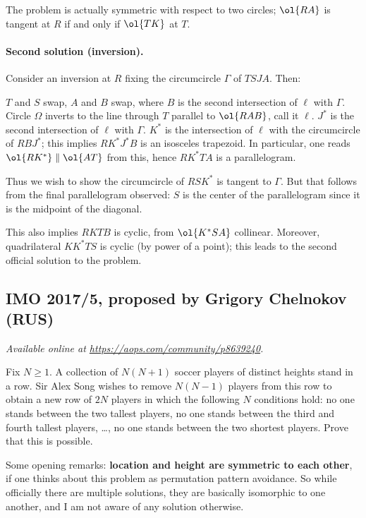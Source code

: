 \documentclass[11pt]{scrartcl}
\begin{document}
\begin{remark*}
  The problem is actually symmetric with respect to two circles;
  $\ol{RA}$ is tangent at $R$ if and only if $\ol{TK}$ at $T$.
\end{remark*}

\paragraph{Second solution (inversion).}
Consider an inversion at $R$ fixing the circumcircle $\Gamma$ of $TSJA$.
Then:
\begin{itemize}
  \ii $T$ and $S$ swap,
  \ii $A$ and $B$ swap, where $B$ is the second intersection
  of $\ell$ with $\Gamma$.
  \ii Circle $\Omega$ inverts to the line through $T$
  parallel to $\ol{RAB}$, call it $\ell$.
  \ii $J^\ast$ is the second intersection of $\ell$ with $\Gamma$.
  \ii $K^\ast$ is the intersection of $\ell$ with the circumcircle
  of $RBJ^\ast$; this implies $RK^\ast J^\ast B$ is an isosceles trapezoid.
  In particular, one reads $\ol{RK^\ast} \parallel \ol{AT}$ from this,
  hence $RK^\ast TA$ is a parallelogram.
\end{itemize}
Thus we wish to show the circumcircle of $RSK^\ast$ is tangent to $\Gamma$.
But that follows from the final parallelogram observed:
$S$ is the center of the parallelogram since it is the midpoint of the diagonal.

\begin{remark*}
  This also implies $RKTB$ is cyclic, from $\ol{K^\ast SA}$ collinear.
  Moreover, quadrilateral $KK^\ast TS$ is cyclic (by power of a point);
  this leads to the second official solution to the problem.
\end{remark*}
\pagebreak

\subsection{IMO 2017/5, proposed by Grigory Chelnokov (RUS)}
\textsl{Available online at \url{https://aops.com/community/p8639240}.}
\begin{mdframed}[style=mdpurplebox,frametitle={Problem statement}]
Fix $N \ge 1$. A collection of $N(N+1)$ soccer players of distinct
heights stand in a row.
Sir Alex Song wishes to remove $N(N-1)$ players from this row
to obtain a new row of $2N$ players in which the following $N$
conditions hold: no one stands between the two tallest players,
no one stands between the third and fourth tallest players, \dots,
no one stands between the two shortest players.
Prove that this is possible.
\end{mdframed}
Some opening remarks:
\textbf{location and height are symmetric to each other},
if one thinks about this problem as permutation pattern avoidance.
So while officially there are multiple solutions,
they are basically isomorphic to one another,
and I am not aware of any solution otherwise.
\end{document}
